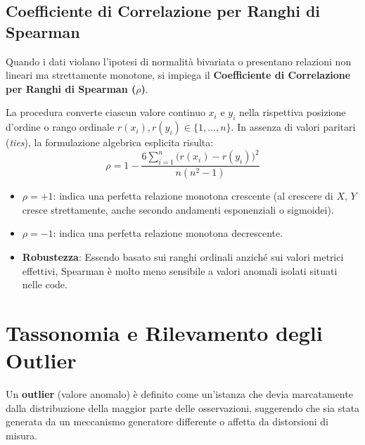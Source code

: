 \subsection{Coefficiente di Correlazione per Ranghi di Spearman}

Quando i dati violano l'ipotesi di normalità bivariata o presentano relazioni non lineari ma strettamente monotone, si impiega il \textbf{Coefficiente di Correlazione per Ranghi di Spearman ($\rho$)}.

La procedura converte ciascun valore continuo $x_i$ e $y_i$ nella rispettiva posizione d'ordine o rango ordinale $r(x_i), r(y_i) \in \{1, \dots, n\}$. In assenza di valori paritari (\textit{ties}), la formulazione algebrica esplicita risulta:
\begin{equation}
    \rho = 1 - \frac{6 \sum_{i=1}^n \big(r(x_i) - r(y_i)\big)^2}{n(n^2 - 1)}
\end{equation}

\begin{itemize}[noitemsep]
    \item $\rho = +1$: indica una perfetta relazione monotona crescente (al crescere di $X$, $Y$ cresce strettamente, anche secondo andamenti esponenziali o sigmoidei).
    \item $\rho = -1$: indica una perfetta relazione monotona decrescente.
    \item \textbf{Robustezza}: Essendo basato sui ranghi ordinali anziché sui valori metrici effettivi, Spearman è molto meno sensibile a valori anomali isolati situati nelle code.
\end{itemize}

\section{Tassonomia e Rilevamento degli Outlier}
\label{sec:dm-outlier-detection-taxonomy}

Un \textbf{outlier} (valore anomalo) è definito come un'istanza che devia marcatamente dalla distribuzione della maggior parte delle osservazioni, suggerendo che sia stata generata da un meccanismo generatore differente o affetta da distorsioni di misura.

